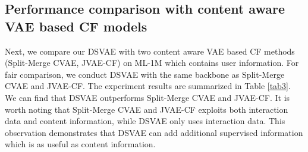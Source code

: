 \subsection{Performance comparison with content aware VAE based CF models}\label{subsec2}
Next, we compare our DSVAE with two content aware VAE based CF methods (Split-Merge CVAE, JVAE-CF) on ML-1M which contains user information. For fair comparison, we conduct DSVAE with the same backbone as Split-Merge CVAE and JVAE-CF. The experiment results are summarized in Table \ref{tab3}. %
We can find that DSVAE outperforms Split-Merge CVAE and JVAE-CF. It is worth noting that Split-Merge CVAE and JVAE-CF exploits both interaction data and content information, while DSVAE only uses interaction data. This observation demonstrates that DSVAE can add additional supervised information which is as useful as content information.
